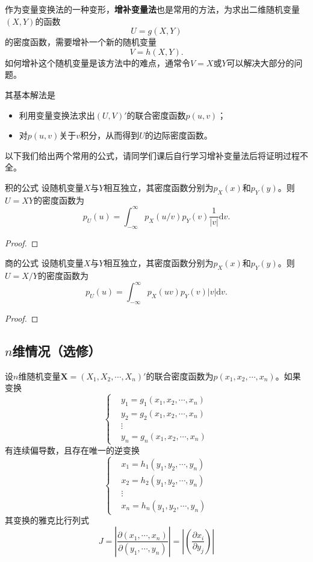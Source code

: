 \begin{remark}
作为变量变换法的一种变形，\textbf{增补变量法}也是常用的方法，为求出二维随机变量$(X,Y)$的函数$$U=g(X,Y)$$的密度函数，需要增补一个新的随机变量$$V = h(X,Y).$$如何增补这个随机变量是该方法中的难点，通常令$V = X$或$Y$可以解决大部分的问题。

其基本解法是
\begin{itemize}
    \item 利用变量变换法求出$(U,V)'$的联合密度函数$p(u,v)$；
    \item 对$p(u,v)$关于$v$积分，从而得到$U$的边际密度函数。
\end{itemize}
\end{remark}
以下我们给出两个常用的公式，请同学们课后自行学习增补变量法后将证明过程不全。
\begin{example}{积的公式}
    设随机变量$X$与$Y$相互独立，其密度函数分别为$p_X(x)$和$p_{Y}(y)$。则$U= XY$的密度函数为
    $$
    p_U(u) = \int_{-\infty}^{\infty} p_{X}(u/v)p_{Y}(v)\frac{1}{|v|} \text{d}v.
    $$
\end{example}
\begin{proof}
    \vspace{5cm}
\end{proof}

\begin{example}{商的公式}
    设随机变量$X$与$Y$相互独立，其密度函数分别为$p_X(x)$和$p_{Y}(y)$。则$U= X/Y$的密度函数为
    $$
    p_U(u) = \int_{-\infty}^{\infty} p_{X}(uv)p_{Y}(v)|v| \text{d}v.
    $$
\end{example}
\begin{proof}
    \vspace{5cm}
\end{proof}

\subsection{$n$维情况（选修）}
设$n$维随机变量$\bm{X}=\left(X_{1}, X_{2}, \cdots, X_{n}\right)'$的联合密度函数为$p(x_1,x_2,\cdots,x_n)$。如果变换
$$\left\{\begin{aligned}
&y_{1}=g_{1}\left(x_{1}, x_{2}, \cdots, x_{n}\right) \\
&y_{2}=g_{2}\left(x_{1}, x_{2}, \cdots, x_{n}\right) \\
&\vdots \\
&y_{n}=g_{n}\left(x_{1}, x_{2}, \cdots, x_{n}\right)
\end{aligned} \right.$$
有连续偏导数，且存在唯一的逆变换
$$\left\{\begin{aligned}
&x_{1}=h_{1}\left(y_{1}, y_{2}, \cdots, y_{n}\right) \\
&x_{2}=h_{2}\left(y_{1}, y_{2}, \cdots, y_{n}\right) \\
&\vdots \\
&x_{n}=h_{n}\left(y_{1}, y_{2}, \cdots, y_{n}\right)
\end{aligned}\right.
$$
其变换的雅克比行列式$$
J=\left|\frac{\partial\left(x_{1}, \cdots, x_{n}\right)}{\partial\left(y_{1}, \cdots, y_{n}\right)}\right|=\left|\left(\frac{\partial x_{i}}{\partial y_{j}}\right)\right|$$


